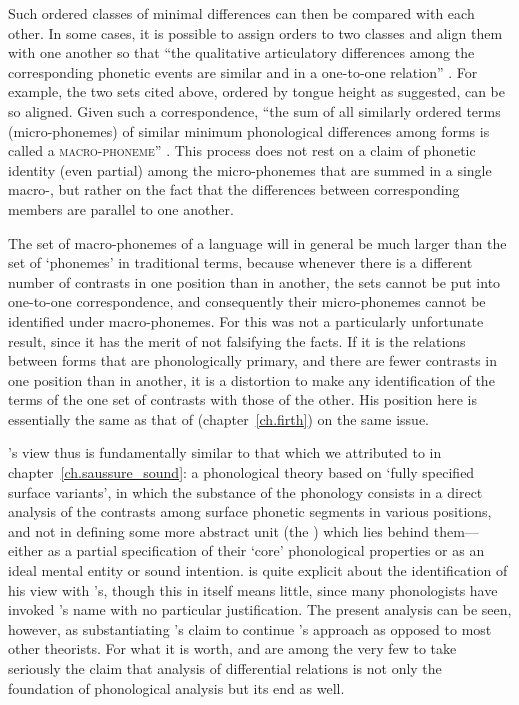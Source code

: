 Such ordered classes of minimal differences can then be compared with
each other. In some cases, it is possible to assign orders to two
classes and align them with one another so that ``the qualitative
articulatory differences among the corresponding phonetic events are
similar and in a one-to-one relation''
\citep[38]{twaddell35:on.defining}. For example, the two sets cited
above, ordered by tongue height as suggested, can be so aligned. Given
such a correspondence, ``the sum of all similarly ordered terms
(micro-phonemes) of similar minimum phonological differences among
forms is called a \textsc{macro-phoneme}''
\citep[35]{twaddell35:on.defining}. This process does not rest on a
claim of phonetic identity (even partial) among the micro-phonemes
that are summed in a single macro-, but rather on the fact that
the differences between corresponding members are parallel to one
another.

The set of macro-phonemes of a language will in general be much larger
than the set of `phonemes' in traditional terms, because whenever
there is a different number of contrasts in one position than in
another, the  sets cannot be put into one-to-one
correspondence, and consequently their micro-phonemes cannot be
identified under macro-phonemes. For {\Twaddell} this was not a
particularly unfortunate result, since it has the merit of not
falsifying the facts. If it is the relations between forms that are
phonologically primary, and there are fewer contrasts in one position
than in another, it is a distortion to make any identification of the
terms of the one set of contrasts with those of the other. His
position here is essentially the same as that of {\Firth}
(chapter~\ref{ch.firth}) on the same issue.

{\Twaddell}'s view thus is fundamentally similar to that which we
attributed to {\Saussure} in chapter~\ref{ch.saussure_sound}: a
phonological theory based on `fully specified surface variants', in
which the substance of the phonology consists in a direct analysis of
the contrasts among surface phonetic segments in various positions,
and not in defining some more abstract unit (the ) which lies
behind them—either as a partial specification of their `core'
phonological properties or as an ideal mental entity or sound
intention. {\Twaddell} is quite explicit about the identification of his
view with {\Saussure}'s, though this in itself means little, since many
phonologists have invoked {\Saussure}'s name with no particular
justification. The present analysis can be seen, however, as
substantiating {\Twaddell}'s claim to continue {\Saussure}'s approach as
opposed to most other theorists. For what it is worth, {\Saussure} and
{\Twaddell} are among the very few to take seriously the claim that
analysis of differential relations is not only the foundation of
phonological analysis but its end as well.


